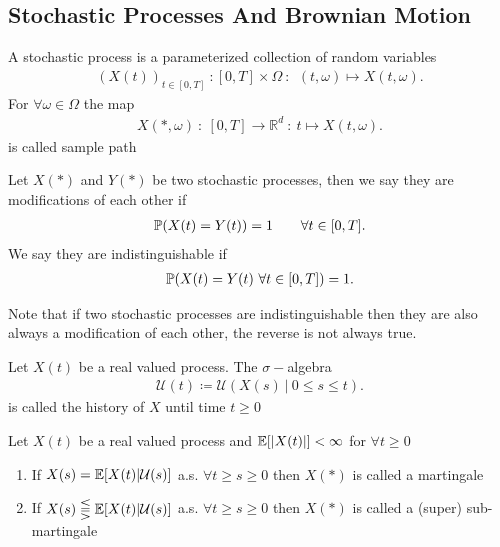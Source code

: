 \subsection{Stochastic Processes And Brownian Motion}
\begin{definition}
 A stochastic process is a parameterized collection of random variables 
 \begin{align*}
   (X(t))_{t \in [0,T]} \ : [0,T] \times \Omega  \ : \ \ (t,\omega ) \mapsto X(t,\omega )
 .\end{align*}
 For $\forall  \omega  \in  \Omega $ the map 
 \begin{align*}
   X(*,\omega ) \ : \ [0,T] \to \mathbb{R}^{d}  \ : \ t \mapsto X(t,\omega )
 .\end{align*}
 is called sample path
\end{definition}
\begin{definition}
 Let $X(*)$  and $Y(*)$ be two stochastic processes, then we say they are modifications of each other if 
 \begin{align*}
   \P(X(t) = Y(t))  = 1 \qquad \forall t \in [0,T] 
 .\end{align*}
 We say they are indistinguishable if 
 \begin{align*}
   \P(X(t) = Y(t) \ \forall  t \in  [0,T])  = 1 
 .\end{align*}
\end{definition}
\begin{remark}
 Note that if two stochastic processes are indistinguishable then they are also always a modification of each other,
 the reverse is not always true.
\end{remark}
\begin{definition}[History]
 Let $X(t)$ be a real valued process. The $\sigma-$algebra 
 \begin{align*}
  \mathcal{U}(t) \coloneqq  \mathcal{U}(X(s) \ | \ 0\le s\le t)
 .\end{align*}
 is called the history of $X$ until time $t\ge 0$
\end{definition}
\begin{definition}[Martingale]
  Let $X(t)$ be a real valued process and $\E[\abs{X(t)}] < \infty$  for $\forall t \ge 0$
  \begin{enumerate}
    \item If $X(s) = \E[X(t)|\mathcal{U}(s)]$ a.s. $\forall  t \ge  s \ge  0$  then $X(*)$ is called a martingale
    \item If $X(s) \lesseqqgtr  \E[X(t)|\mathcal{U}(s)]$ a.s. $\forall  t \ge  s \ge  0$  then $X(*)$ is called a (super) sub-martingale
  \end{enumerate}
\end{definition}
